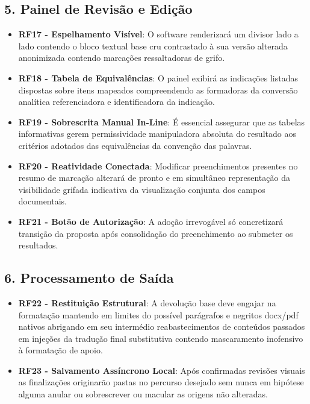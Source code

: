 \documentclass{scrreprt}
\begin{document}
\subsection*{5. Painel de Revisão e Edição}
\begin{itemize}
    \item \textbf{RF17 - Espelhamento Visível}: O software renderizará um divisor lado a lado contendo o bloco textual base cru contrastado à sua versão alterada anonimizada contendo marcações ressaltadoras de grifo.
    \item \textbf{RF18 - Tabela de Equivalências}: O painel exibirá as indicações listadas dispostas sobre itens mapeados compreendendo as formadoras da conversão analítica referenciadora e identificadora da indicação.
    \item \textbf{RF19 - Sobrescrita Manual In-Line}: É essencial assegurar que as tabelas informativas gerem permissividade manipuladora absoluta do resultado aos critérios adotados das equivalências da convenção das palavras.
    \item \textbf{RF20 - Reatividade Conectada}: Modificar preenchimentos presentes no resumo de marcação alterará de pronto e em simultâneo representação da visibilidade grifada indicativa da visualização conjunta dos campos documentais.
    \item \textbf{RF21 - Botão de Autorização}: A adoção irrevogável só concretizará transição da proposta após consolidação do preenchimento ao submeter os resultados.
\end{itemize}

\subsection*{6. Processamento de Saída}
\begin{itemize}
    \item \textbf{RF22 - Restituição Estrutural}: A devolução base deve engajar na formatação mantendo em limites do possível parágrafos e negritos docx/pdf nativos abrigando em seu intermédio reabastecimentos de conteúdos passados em injeções da tradução final substitutiva contendo mascaramento inofensivo à formatação de apoio.
    \item \textbf{RF23 - Salvamento Assíncrono Local}: Após confirmadas revisões visuais as finalizações originarão pastas no percurso desejado sem nunca em hipótese alguma anular ou sobrescrever ou macular as origens não alteradas.
\end{itemize}
\end{document}
